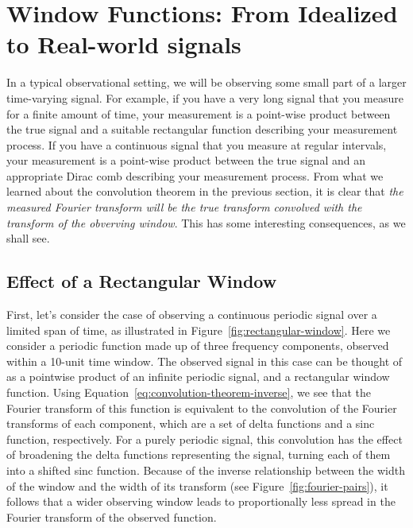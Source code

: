 \documentclass[preprint]{aastex}
\newcommand{\Fig}[1]{Figure~\ref{fig:#1}}
\newcommand{\Eq}[1]{Equation~\ref{eq:#1}}
\newcommand{\eq}[1]{\Eq{#1}}
\newcommand{\sectlabel}[1]{\label{sect:#1}}
\begin{document}
\section{Window Functions: From Idealized to Real-world signals}
\sectlabel{window-functions}

In a typical observational setting, we will be observing some small part of
a larger time-varying signal.
For example, if you have a very long signal that you measure for a finite
amount of time, your measurement is a point-wise product between the true
signal and a suitable rectangular function describing your measurement process.
If you have a continuous signal that you measure at regular intervals, your
measurement is a point-wise product between the true signal and an appropriate
Dirac comb describing your measurement process.
From what we learned about the convolution theorem in the previous section, it
is clear that {\it the measured Fourier transform will be the true transform
convolved with the transform of the obverving window}.
This has some interesting consequences, as we shall see.

\subsection{Effect of a Rectangular Window}

First, let's consider the case of observing a continuous periodic signal over
a limited span of time, as illustrated in \Fig{rectangular-window}.
Here we consider a periodic function made up of three frequency components, observed within a 10-unit time window.
The observed signal in this case can be thought of as a pointwise product of an infinite periodic signal, and a rectangular window function.
Using \eq{convolution-theorem-inverse}, we see that the Fourier transform of
this function is equivalent to the convolution of the Fourier transforms of each component, which are a set of delta functions and a sinc function, respectively.
For a purely periodic signal, this convolution has the effect of broadening the delta functions representing the signal, turning each of them into a shifted sinc function.
Because of the inverse relationship between the width of the window and the width of its transform (see \Fig{fourier-pairs}), it follows that a wider observing window leads to proportionally less spread in the Fourier transform of the observed function.
\end{document}
